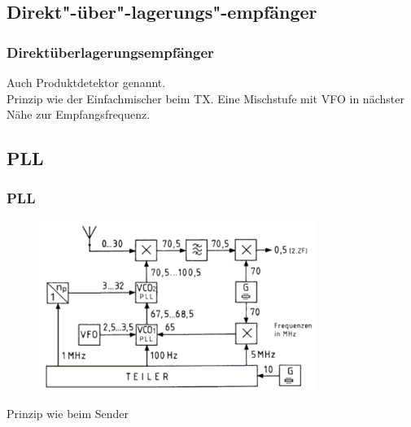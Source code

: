 \subsection{Direkt"-über"-lagerungs"-empfänger}

\begin{frame}
  \frametitle{Direktüberlagerungsempfänger}

  Auch Produktdetektor genannt. \\[2em]

  Prinzip wie der Einfachmischer beim TX. Eine Mischstufe mit VFO in nächster
  Nähe zur Empfangsfrequenz.

\end{frame}

\subsection{PLL}

\begin{frame}
  \frametitle{PLL}

  \begin{center}
    \begin{figure}
      \includegraphics[width=0.8\textwidth,height=.6\textheight,keepaspectratio]{a13/TF213.png}
    \end{figure}
  \end{center}

  Prinzip wie beim Sender
\end{frame}

